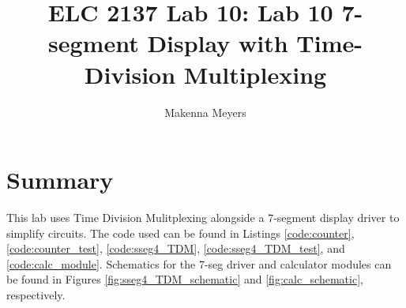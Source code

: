 \documentclass[11pt]{article}
\begin{document}
\title{ELC 2137 Lab 10: Lab 10 7-segment Display with Time-Division Multiplexing}
\author{Makenna Meyers}

\maketitle


\section*{Summary}
 This lab uses Time Division Mulitplexing alongside a 7-segment display driver to simplify circuits. The code used can be found in Listings \ref{code:counter}, \ref{code:counter_test}, \ref{code:sseg4_TDM}, \ref{code:sseg4_TDM_test}, and \ref{code:calc_module}. Schematics for the 7-seg driver and calculator modules can be found in Figures \ref{fig:sseg4_TDM_schematic} and \ref{fig:calc_schematic}, respectively. 
 
\end{document}
